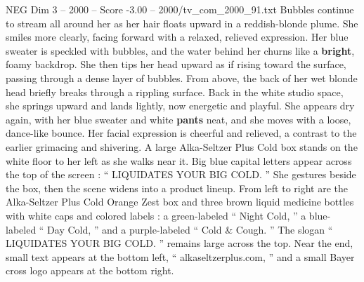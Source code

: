 \begin{textsample}{NEG Dim 3 – 2000 – Score -3.00 – 2000/tv\_com\_2000\_91.txt}
Bubbles continue to stream all around her as her hair floats upward in a reddish-blonde plume.
She smiles more clearly, facing forward with a relaxed, relieved expression.
Her blue sweater is speckled with bubbles, and the water behind her churns like a \textbf{bright}, foamy backdrop.
She then tips her head upward as if rising toward the surface, passing through a dense layer of bubbles.
From above, the back of her wet blonde head briefly breaks through a rippling surface.
Back in the white studio space, she springs upward and lands lightly, now energetic and playful.
She appears dry again, with her blue sweater and white \textbf{pants} neat, and she moves with a loose, dance-like bounce.
Her facial expression is cheerful and relieved, a contrast to the earlier grimacing and shivering.
A large Alka-Seltzer Plus Cold box stands on the white floor to her left as she walks near it.
Big blue capital letters appear across the top of the screen : “ LIQUIDATES YOUR BIG COLD. ” She gestures beside the box, then the scene widens into a product lineup.
From left to right are the Alka-Seltzer Plus Cold Orange Zest box and three brown liquid medicine bottles with white caps and colored labels : a green-labeled “ Night Cold, ” a blue-labeled “ Day Cold, ” and a purple-labeled “ Cold \& Cough. ” The slogan “ LIQUIDATES YOUR BIG COLD. ” remains large across the top.
Near the end, small text appears at the bottom left, “ alkaseltzerplus.com, ” and a small Bayer cross logo appears at the bottom right.

\end{textsample}
